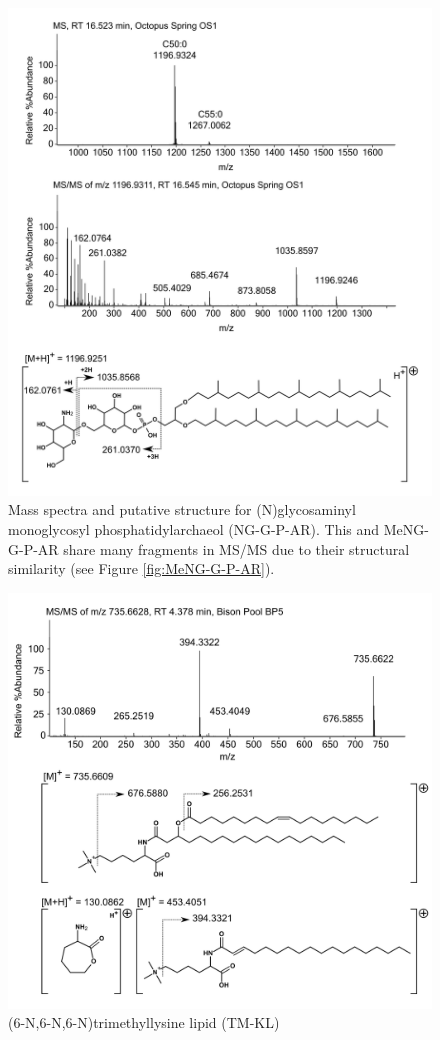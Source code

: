 \begin{figure}[h]
\centering
\includegraphics[width=\linewidth]{figs_app1/NG-G-P-AR}
\caption{Mass spectra and putative structure for (N)glycosaminyl monoglycosyl phosphatidylarchaeol (NG-G-P-AR). This and MeNG-G-P-AR share many fragments in MS/MS due to their structural similarity (see Figure \ref{fig:MeNG-G-P-AR}).}
\label{fig:NG-G-P-AR_percent}
\end{figure}

\begin{figure}[h]
\centering
\includegraphics[width=\linewidth]{figs_app1/TM-KL}
\caption{(6-N,6-N,6-N)trimethyllysine lipid (TM-KL)}
\label{fig:TM-KL}
\end{figure}


